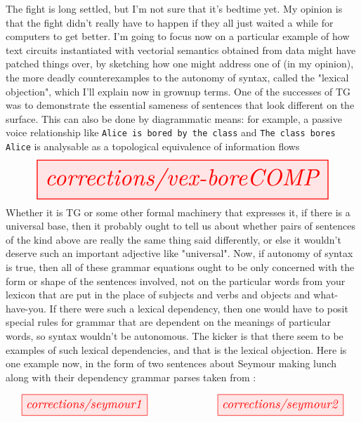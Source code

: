 The fight is long settled, but I'm not sure that it's bedtime yet. My opinion is that the fight didn't really have to happen if they all just waited a while for computers to get better. I'm going to focus now on a particular example of how text circuits instantiated with vectorial semantics obtained from data might have patched things over, by sketching how one might address one of (in my opinion), the more deadly counterexamples to the autonomy of syntax, called the "lexical objection", which I'll explain now in grownup terms. One of the successes of TG was to demonstrate the essential sameness of sentences that look different on the surface. This can also be done by diagrammatic means: for example, a passive voice relationship like \texttt{Alice is bored by the class} and \texttt{The class bores Alice} is analysable as a topological equivalence of information flows \citep{coeckeGrammarEquations2021a}
\[
\resizebox{\textwidth}{!}{
\tikzfig{corrections/vex-boreCOMP}
}
\]
Whether it is TG or some other formal machinery that expresses it, if there is a universal base, then it probably ought to tell us about whether pairs of sentences of the kind above are really the same thing said differently, or else it wouldn't deserve such an important adjective like "universal". Now, if autonomy of syntax is true, then all of these grammar equations ought to be only concerned with the form or shape of the sentences involved, not on the particular words from your lexicon that are put in the place of subjects and verbs and objects and what-have-you. If there were such a lexical dependency, then one would have to posit special rules for grammar that are dependent on the meanings of particular words, so syntax wouldn't be autonomous. The kicker is that there seem to be examples of such lexical dependencies, and that is the lexical objection. Here is one example now, in the form of two sentences about Seymour making lunch \citep{lakoffInstrumentalAdverbsConcept1968} along with their dependency grammar parses taken from \citep{DisplaCyDependencyVisualizer}:

\[\resizebox{\textwidth}{!}{\tikzfig{corrections/seymour1} \qquad\qquad \tikzfig{corrections/seymour2}}\]

